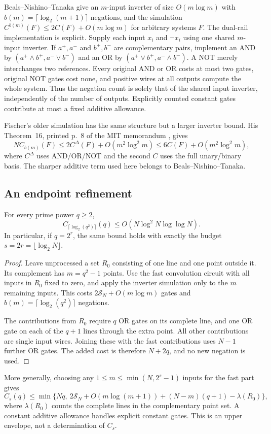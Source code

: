 Beals--Nishino--Tanaka \cite[Theorem~1.1, p.~1335;
Corollary~1.2, p.~1336]{BealsNishinoTanaka1998}
give an $m$-input inverter of size $O(m\log m)$ with
$b(m)=\lceil\log_2(m+1)\rceil$ negations, and the simulation
$C^{b(m)}(F)\leq2C(F)+O(m\log m)$ for arbitrary systems $F$.
The dual-rail implementation is explicit. Supply each input
$x_i$ and $\neg x_i$ using one shared $m$-input inverter.
If $a^+,a^-$ and $b^+,b^-$ are complementary pairs, implement an AND
by $(a^+\wedge b^+,a^-\vee b^-)$ and an OR by
$(a^+\vee b^+,a^-\wedge b^-)$.
A NOT merely interchanges two references.
Every original AND or OR costs at most two gates, original NOT
gates cost none, and positive wires at all outputs compute the
whole system. Thus the negation count is solely that of the
shared input inverter, independently of the number of outputs.
Explicitly counted constant gates contribute at most a fixed
additive allowance.

Fischer's older simulation has the same structure but a larger
inverter bound. His Theorem~16, printed p.~8 of the MIT memorandum
\cite{Fischer1975}, gives
\[
 NC_{b(m)}(F)\le 2C^\Delta(F)+O(m^2\log^2m)
              \le 6C(F)+O(m^2\log^2m),
\]
where $C^\Delta$ uses AND/OR/NOT and the second $C$ uses the full
unary/binary basis. The sharper additive term used here belongs
to Beals--Nishino--Tanaka.

\subsection{An endpoint refinement}


\begin{proposition}
For every prime power $q\geq2$,
\[
 C_{\lceil\log_2(q^2)\rceil}(q)
 \leq O(N\log^2N\log\log N).
\]
In particular, if $q=2^r$, the same bound holds with exactly the
budget $s=2r=\lfloor\log_2N\rfloor$.
\end{proposition}
\begin{proof}
Leave unprocessed a set $R_0$ consisting of one line and one point
outside it. Its complement has $m=q^2-1$ points. Use the fast
convolution circuit with all inputs in $R_0$ fixed to zero, and
apply the inverter simulation only to the $m$ remaining inputs.
This costs $2\mathcal S_N+O(m\log m)$ gates and
$b(m)=\lceil\log_2(q^2)\rceil$ negations.

The contributions from $R_0$ require $q$ OR gates on its complete
line, and one OR gate on each of the $q+1$ lines through the extra
point. All other contributions are single input wires.
Joining these with the fast contributions uses $N-1$ further
OR gates. The added cost is therefore $N+2q$, and no new negation
is used.
\end{proof}
More generally, choosing any $1\leq m\leq\min(N,2^s-1)$ inputs for the fast
part gives
\[
 C_s(q)\leq
 \min\{Nq,\ 2\mathcal S_N+O(m\log(m+1))
 +(N-m)(q+1)-\lambda(R_0)\},
\]
where $\lambda(R_0)$ counts the complete lines in the complementary
point set. A constant additive allowance handles explicit constant
gates. This is an upper envelope, not a determination of $C_s$.

